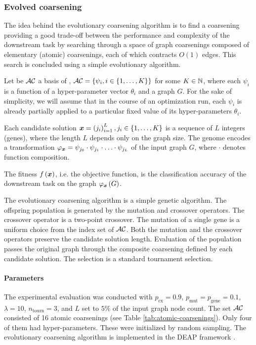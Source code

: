 \subsubsection{Evolved coarsening}

The idea behind the evolutionary coarsening algorithm is to find a coarsening providing a good trade-off between the performance and complexity of the downstream task by searching through a space of graph coarsenings composed of elementary (atomic) coarsenings, each of which contracts \( O(1) \) edges. This search is concluded using a simple evolutionary algorithm.

Let be \( \mathcal{AC} \) a basis of , \( \mathcal{AC} = \left\{\psi_i, i \in \left\{1, \dots, K \right\} \right\} \) for some \( K \in \mathbb{N} \), where each \( \psi_i \) is a function of a hyper-parameter vector \( \theta_i \) and a graph \( G \). For the sake of simplicity, we will assume that in the course of an optimization run, each \( \psi_i \) is already partially applied to a particular fixed value of its hyper-parameters \( \theta_i \).

Each candidate solution \( \bm{x} = \left( j_i \right)_{i = 1}^L, j_i \in \left\{1, \dots, K \right\} \) is a sequence of \( L \) integers (genes), where the length \( L \) depends only on the graph size. The genome encodes a transformation \( \varphi_{\bm{x}} = \psi_{j_0} \cdot \psi_{j_1} \cdot \ldots \cdot \psi_{j_L} \) of the input graph \( G \), where \( \cdot \) denotes function composition.

The fitness \( f \left( \bm{x} \right) \), i.e. the objective function, is the classification accuracy of the downstream task on the graph \( \varphi_{\bm{x}} \left( G \right) \).

The evolutionary coarsening algorithm is a simple genetic algorithm. The offspring population is generated by the mutation and crossover operators. The crossover operator is a two-point crossover. The mutation of a single gene is a uniform choice from the index set of \( \mathcal{AC} \). Both the mutation and the crossover operators preserve the candidate solution length. Evaluation of the population passes the original graph through the composite coarsening defined by each candidate solution. The selection is a standard tournament selection.

\paragraph{Parameters} The experimental evaluation was conducted with \( p_\mathrm{cx} = 0.9 \), \( p_\mathrm{mut} = p_\mathrm{gene} = 0.1 \), \( \lambda = 10 \), \( n_\mathrm{tourn} = 3 \), and \( L \) set to \( 5\% \) of the input graph node count. The set \( \mathcal{AC} \) consisted of 16 atomic coarsenings (see Table \ref{tab:atomic-coarsenings}). Only four of them had hyper-parameters. These were initialized by random sampling. The evolutionary coarsening algorithm is implemented in the DEAP framework \cite{fortin_deap_2012}.

